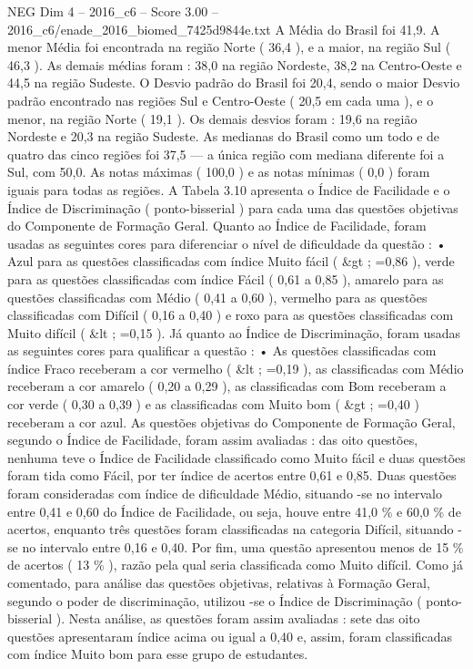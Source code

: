 \begin{textsample}{NEG Dim 4 – 2016\_c6 – Score 3.00 – 2016\_c6/enade\_2016\_biomed\_7425d9844e.txt}
A Média do Brasil foi 41,9.
A menor Média foi encontrada na região Norte ( 36,4 ), e a maior, na região Sul ( 46,3 ).
As demais médias foram : 38,0 na região Nordeste, 38,2 na Centro-Oeste e 44,5 na região Sudeste.
O Desvio padrão do Brasil foi 20,4, sendo o maior Desvio padrão encontrado nas regiões Sul e Centro-Oeste ( 20,5 em cada uma ), e o menor, na região Norte ( 19,1 ).
Os demais desvios foram : 19,6 na região Nordeste e 20,3 na região Sudeste.
As medianas do Brasil como um todo e de quatro das cinco regiões foi 37,5 — a única região com mediana diferente foi a Sul, com 50,0.
As notas máximas ( 100,0 ) e as notas mínimas ( 0,0 ) foram iguais para todas as regiões.
A Tabela 3.10 apresenta o Índice de Facilidade e o Índice de Discriminação ( ponto-bisserial ) para cada uma das questões objetivas do Componente de Formação Geral.
Quanto ao Índice de Facilidade, foram usadas as seguintes cores para diferenciar o nível de dificuldade da questão : • Azul para as questões classificadas com índice Muito fácil ( \&gt ; =0,86 ), verde para as questões classificadas com índice Fácil ( 0,61 a 0,85 ), amarelo para as questões classificadas com Médio ( 0,41 a 0,60 ), vermelho para as questões classificadas com Difícil ( 0,16 a 0,40 ) e roxo para as questões classificadas com Muito difícil ( \&lt ; =0,15 ).
Já quanto ao Índice de Discriminação, foram usadas as seguintes cores para qualificar a questão : • As questões classificadas com índice Fraco receberam a cor vermelho ( \&lt ; =0,19 ), as classificadas com Médio receberam a cor amarelo ( 0,20 a 0,29 ), as classificadas com Bom receberam a cor verde ( 0,30 a 0,39 ) e as classificadas com Muito bom ( \&gt ; =0,40 ) receberam a cor azul.
As questões objetivas do Componente de Formação Geral, segundo o Índice de Facilidade, foram assim avaliadas : das oito questões, nenhuma teve o Índice de Facilidade classificado como Muito fácil e duas questões foram tida como Fácil, por ter índice de acertos entre 0,61 e 0,85.
Duas questões foram consideradas com índice de dificuldade Médio, situando -se no intervalo entre 0,41 e 0,60 do Índice de Facilidade, ou seja, houve entre 41,0 \% e 60,0 \% de acertos, enquanto três questões foram classificadas na categoria Difícil, situando -se no intervalo entre 0,16 e 0,40.
Por fim, uma questão apresentou menos de 15 \% de acertos ( 13 \% ), razão pela qual seria classificada como Muito difícil.
Como já comentado, para análise das questões objetivas, relativas à Formação Geral, segundo o poder de discriminação, utilizou -se o Índice de Discriminação ( ponto-bisserial ).
Nesta análise, as questões foram assim avaliadas : sete das oito questões apresentaram índice acima ou igual a 0,40 e, assim, foram classificadas com índice Muito bom para esse grupo de estudantes.

\end{textsample}
